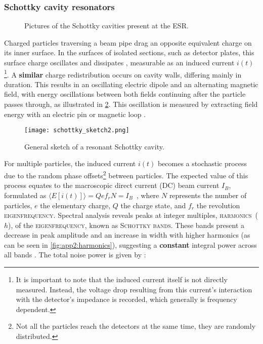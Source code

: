 \subsubsection{Schottky cavity resonators}\label{subsubsec:chap2:schottkyCR}
\begin{figure}[hbt]
    \centering
    \hspace{0.7cm}
    \caption{Pictures of the Schottky cavities present at the \textsc{ESR}.}
    \label{fig:chap2:schottkies}
  \end{figure}
Charged particles traversing a beam pipe drag an opposite equivalent charge on its inner surface. In the surfaces of isolated sections, such as detector plates, this surface charge oscillates and dissipates \cite{schottky_book}, measurable as an induced current $i(t)$\footnote{It is important to note that the induced current itself is not directly measured. Instead, the voltage drop resulting from this current's interaction with the detector's impedance is recorded, which generally is frequency dependent.}.
A \textbf{similar} charge redistribution occurs on cavity walls, differing mainly in duration. This results in an oscillating electric dipole and an alternating magnetic field, with energy oscillations between both fields continuing after the particle passes through, as illustrated in \cref{fig:chap2:schottkysketch}. This oscillation is measured by extracting field energy with an electric pin or magnetic loop \cite{shahab_thesis,Sanjari_2013,Sanjari-410}.
\newpar
\begin{figure}[hbt]
    \centering
    \texttt{[image: schottky\_sketch2.png]}
    \caption{General sketch of a resonant Schottky cavity.}
    \label{fig:chap2:schottkysketch}
\end{figure}
For multiple particles, the induced current $i(t)$ becomes a stochastic process due to the random phase offsets\footnote{Not all the particles reach the detectors at the same time, they are randomly distributed.} between particles. The expected value of this process equates to the macroscopic direct current (DC) beam current $I_B$, formulated as $\langle E [i(t)] \rangle = Qef_r N = I_B$~\cite{shahab_thesis}, where $N$ represents the number of particles, $e$ the elementary charge, $Q$ the charge state, and $f_r$ the revolution \textsc{eigenfrequency}. Spectral analysis reveals peaks at integer multiples, \textsc{harmonics}~($h$), of the \textsc{eigenfrequency}, known as \textsc{Schottky bands}. These bands present a decrease in peak amplitude and an increase in width with higher harmonics (as can be seen in \cref{fig:app2:harmonics}), suggesting a \textbf{constant} integral power across all bands \cite{schottky_book}. The total noise power is given by \cite{CaspersSchottky}:
